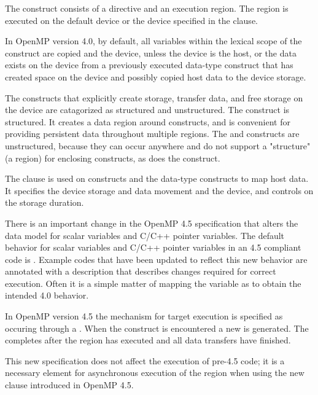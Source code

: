 \label{chap:devices}

The  construct consists of a  directive 
and an execution region. The  region is executed on
the default device or the device specified in the  
clause. 

In OpenMP version 4.0, by default, all variables within the lexical
scope of the construct are copied  and  the
device, unless the device is the host, or the data exists on the
device from a previously executed data-type construct that
has created space on the device and possibly copied host
data to the device storage.

The constructs that explicitly
create storage, transfer data, and free storage on the device
are catagorized as structured and unstructured. The
  construct is structured. It creates
a data region around  constructs, and is
convenient for providing persistent data throughout multiple
 regions. The    and 
   constructs are unstructured, because 
they can occur anywhere and do not support a "structure" 
(a region) for enclosing  constructs, as does the
  construct. 

The  clause is used on  
constructs and the data-type constructs to map host data. It 
specifies the device storage and data movement  and 
the device, and controls on the storage duration.

There is an important change in the OpenMP 4.5 specification
that alters the data model for scalar variables and C/C++ pointer variables.
The default behavior for scalar variables and C/C++ pointer variables
in an 4.5 compliant code is . Example
codes that have been updated to reflect this new behavior are
annotated with a description that describes changes required
for correct execution. Often it is a simple matter of mapping
the variable as  to obtain the intended 4.0 behavior.

In OpenMP version 4.5 the mechanism for target
execution is specified as occuring through a . 
When the  construct is encountered a new 
 is generated. The  
completes after the  region has executed and all data 
transfers have finished.

This new specification does not affect the execution of 
pre-4.5 code; it is a necessary element for asynchronous 
execution of the  region when using the new  
clause introduced in OpenMP 4.5.


